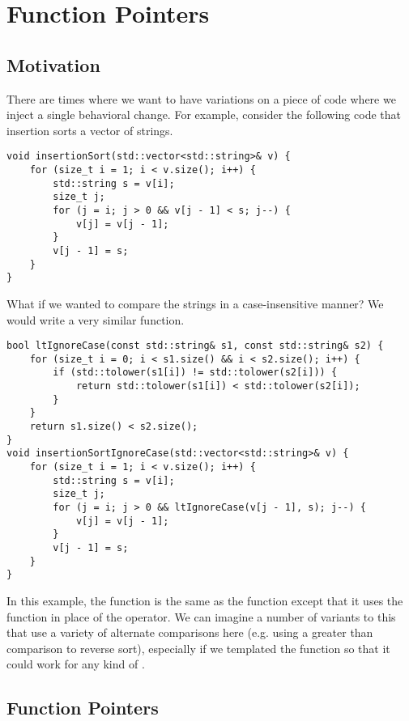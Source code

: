 \chapter{Function Pointers}\label{ch:FuncPtrs}

\section{Motivation}\label{sec:fp-motivation}

There are times where we want to have variations on a piece of code where we inject a single behavioral change.
For example, consider the following code that insertion sorts a vector of strings.

\begin{lstlisting}
void insertionSort(std::vector<std::string>& v) {
	for (size_t i = 1; i < v.size(); i++) {
		std::string s = v[i];
		size_t j;
		for (j = i; j > 0 && v[j - 1] < s; j--) {
			v[j] = v[j - 1];
		}
		v[j - 1] = s;
	}
}
\end{lstlisting}

What if we wanted to compare the strings in a case-insensitive manner?
We would write a very similar function.

\begin{lstlisting}
bool ltIgnoreCase(const std::string& s1, const std::string& s2) {
	for (size_t i = 0; i < s1.size() && i < s2.size(); i++) {
		if (std::tolower(s1[i]) != std::tolower(s2[i])) {
			return std::tolower(s1[i]) < std::tolower(s2[i]);
		}
	}
	return s1.size() < s2.size();
}
void insertionSortIgnoreCase(std::vector<std::string>& v) {
	for (size_t i = 1; i < v.size(); i++) {
		std::string s = v[i];
		size_t j;
		for (j = i; j > 0 && ltIgnoreCase(v[j - 1], s); j--) {
			v[j] = v[j - 1];
		}
		v[j - 1] = s;
	}
}
\end{lstlisting}

In this example, the  function is the same as the  function except that it uses the  function in place of the \code{<} operator.
We can imagine a number of variants to this that use a variety of alternate comparisons here (e.g. using a greater than comparison to reverse sort),
especially if we templated the function so that it could work for any kind of .

\section{Function Pointers}

